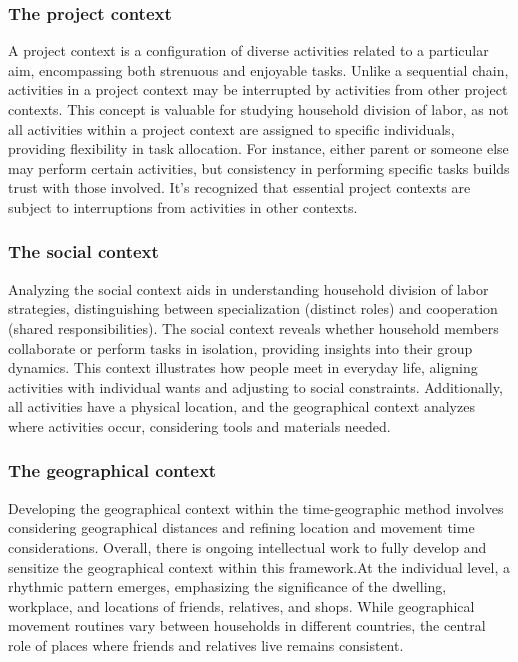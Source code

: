 \documentclass{chart}
\begin{document}
\subsubsection{ The project context}
A project context is a configuration of diverse activities related to a particular aim, encompassing both strenuous and enjoyable tasks. Unlike a sequential chain, activities in a project context may be interrupted by activities from other project contexts. This concept is valuable for studying household division of labor, as not all activities within a project context are assigned to specific individuals, providing flexibility in task allocation. For instance, either parent or someone else may perform certain activities, but consistency in performing specific tasks builds trust with those involved. It's recognized that essential project contexts are subject to interruptions from activities in other contexts.
\subsubsection{ The social context}
Analyzing the social context aids in understanding household division of labor strategies, distinguishing between specialization (distinct roles) and cooperation (shared responsibilities). The social context reveals whether household members collaborate or perform tasks in isolation, providing insights into their group dynamics. This context illustrates how people meet in everyday life, aligning activities with individual wants and adjusting to social constraints. Additionally, all activities have a physical location, and the geographical context analyzes where activities occur, considering tools and materials needed.
\subsubsection{ The geographical context}
Developing the geographical context within the time-geographic method involves considering geographical distances and refining location and movement time considerations. Overall, there is ongoing intellectual work to fully develop and sensitize the geographical context within this framework.At the individual level, a rhythmic pattern emerges, emphasizing the significance of the dwelling, workplace, and locations of friends, relatives, and shops. While geographical movement routines vary between households in different countries, the central role of places where friends and relatives live remains consistent.
\end{document}

